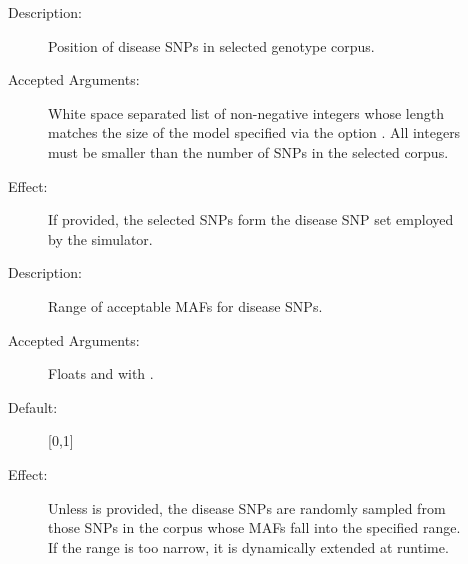 \documentclass[a4paper,10pt,english]{sphinxhowto}
\begin{document}
\begin{description}
\begin{description}
\begin{description}
\end{description}

\end{description}

\item[{\sphinxstylestrong{Optional Mutually Exclusive Arguments:}}] \leavevmode\begin{description}
\item[{}] \leavevmode\begin{description}
\item[{Description:}] \leavevmode
Position of disease SNPs in selected genotype corpus.

\item[{Accepted Arguments:}] \leavevmode
White space separated list of non-negative integers whose length matches the size of the model specified
via the option . All integers must be smaller than the number of SNPs in the selected corpus.

\item[{Effect:}] \leavevmode
If provided, the selected SNPs form the disease SNP set employed by the simulator.

\end{description}

\item[{}] \leavevmode\begin{description}
\item[{Description:}] \leavevmode
Range of acceptable MAFs for disease SNPs.

\item[{Accepted Arguments:}] \leavevmode
Floats  and  with .

\item[{Default:}] \leavevmode
{[}0,1{]}

\item[{Effect:}] \leavevmode
Unless  is provided, the disease SNPs are randomly sampled from those SNPs in the corpus whose MAFs
fall into the specified range. If the range is too narrow, it is dynamically extended at runtime.

\end{description}


\end{description}
\end{description}
\end{document}
